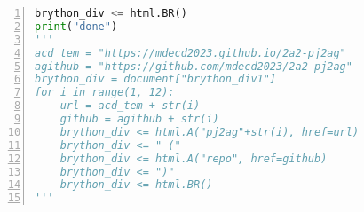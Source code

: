 \begin{lstlisting}[language=Python, frame=single, numbers=left, captionpos=b, basicstyle=\ttfamily\small, showstringspaces=false, breaklines=true, tabsize=4, xleftmargin=15pt]
    brython_div <= html.BR()
print("done")
'''
acd_tem = "https://mdecd2023.github.io/2a2-pj2ag"
agithub = "https://github.com/mdecd2023/2a2-pj2ag"
brython_div = document["brython_div1"]
for i in range(1, 12):
    url = acd_tem + str(i)
    github = agithub + str(i)
    brython_div <= html.A("pj2ag"+str(i), href=url)
    brython_div <= " ("
    brython_div <= html.A("repo", href=github)
    brython_div <= ")"
    brython_div <= html.BR()
'''\end{lstlisting}